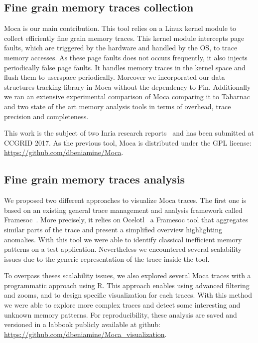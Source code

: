 \subsection{Fine grain memory traces collection}

\gls{Moca} is our main contribution.
This tool relies on a \gls{Linux} kernel module to collect efficiently fine grain memory traces.
This kernel module intercepts page faults, which are triggered by the hardware and handled by the \gls{OS}, to trace memory accesses.
As these page faults does not occurs frequently, it also injects periodically false page faults.
It handles memory traces in the kernel space and flush them to userspace periodically.
Moreover we incorporated our data structures tracking library in \gls{Moca} without the dependency to \gls{Pin}.
Additionally we ran an extensive experimental comparison of \gls{Moca} comparing it to \gls{Tabarnac} and two state of the art memory analysis tools in terms of overhead, trace precision and completeness.

This work is the subject of two Inria research reports~\cite{Beniamine15Memory,Beniamine16Moca} and has been submitted at \gls{CCGRID} 2017.
As the previous tool, \gls{Moca} is distributed under the \gls{GPL} license: \url{https://github.com/dbeniamine/Moca}.

\subsection{Fine grain memory traces analysis}

We proposed two different approaches to visualize \gls{Moca} traces.
The first one is based on an existing general trace management and analysis framework called \gls{Framesoc}~\cite{Pagano14frameSoC}.
More precisely, it relies on \gls{Ocelotl}~\cite{Dosimont14Ocelotl} a \gls{Framesoc} tool that aggregates similar parts of the trace and present a simplified overview highlighting anomalies.
With this tool we were able to identify classical inefficient memory patterns on a test application.
Nevertheless we encountered several scalability issues due to the generic representation of the trace inside the tool.

To overpass theses scalability issues, we also explored several \gls{Moca} traces with a programmatic approach using \gls{R}.
This approach enables using advanced filtering and zooms, and to design specific visualization for each traces.
With this method we were able to explore more complex traces and detect some interesting and unknown memory patterns.
For reproducibility, these analysis are saved and versioned in a labbook publicly available at github:\\
\url{https://github.com/dbeniamine/Moca_visualization}.

